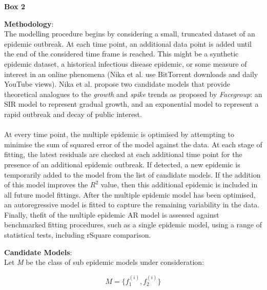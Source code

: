 \documentclass[11pt, a4paper, oneside,titlepage]{article}
\begin{document}
\begin{framed}
{\begin{center}{\bf Box 2}\end{center}}
{\bf Methodology}:\\
The modelling procedure begins by considering a small, truncated
dataset of an epidemic outbreak. At each time point, an additional
data point is added until the end of the considered time frame is
reached. This might be a synthetic epidemic dataset, a historical
infectious disease epidemic, or some measure of interest in an online
phenomena (Nika et al. use BitTorrent downloads and daily YouTube
views). Nika et al. propose two candidate models that provide
theoretical analogues to the \emph{growth} and \emph{spike} trends as
proposed by \emph{Facegroup}: an SIR model to represent gradual
growth, and an exponential model to represent a rapid outbreak and
decay of public interest.\cite{facegroup}\\\\

At every time point, the multiple epidemic is optimised by attempting
to minimise the sum of squared error of the model against the data. At
each stage of fitting, the latest residuals are checked at each
additional time point for the presence of an additional epidemic
outbreak. If detected, a new epidemic is temporarily added to the
model from the list of candidate models. If the addition of this model
improves the $R^2$ value, then this additional epidemic is included in
all future model fittings. After the multiple epidemic model has been
optimised, an autoregressive model is fitted to capture the remaining
variability in the data. Finally, thefit of the multiple epidemic AR
model is assessed against benchmarked fitting procedures, such as a
single epidemic model, using a range of statistical tests, including
rSquare comparison.

{\bf Candidate Models}:\\
Let \emph{M} be the class of sub epidemic models under consideration: 

 \begin{equation*} M  = \{f_{1}^{(i)}, f_{2}^{(i)}\} \end{equation*}


\end{framed}
\end{document}
